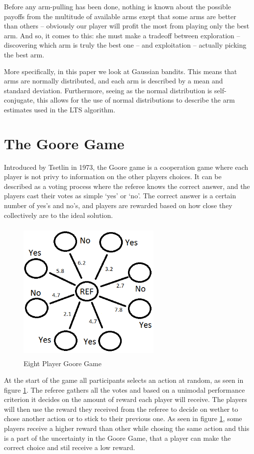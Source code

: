 Before any arm-pulling has been done, nothing is known about the possible 
payoffs from the multitude of available arms exept that some arms are better 
than others -- obviously our player will profit the most from playing only the 
best arm. And so, it comes to this: she must make a tradeoff between exploration 
-- discovering which arm is truly the best one -- and exploitation -- actually 
picking the best arm.

More specifically, in this paper we look at Gaussian bandits.
This means that arms are normally distributed, and each arm is described by a mean and standard deviation.
Furthermore, seeing as the normal distribution is self-conjugate, this allows for the
use of normal distributions to describe the arm estimates used in the LTS algorithm.

\section{The Goore Game}
Introduced by Tsetlin in 1973, the Goore game is a cooperation game where each  
player is not privy to information on the other players choices. It can be 
described as a voting process where the referee knows the correct answer, and 
the players cast their votes as simple ‘yes’ or ‘no’. The correct answer is a 
certain number of yes’s and no’s, and players are rewarded based on how close 
they collectively are to the ideal solution.

\begin{figure}[h]
\centering
\includegraphics[height=70mm,width=70mm]{images/goore_game}
\caption{Eight Player Goore Game}
\label{fig:gg}
\end{figure}
At the start of the game all participants selects an action at random, as seen in figure \ref{fig:gg}. The referee
gathers all the votes and based on a unimodal performance criterion it decides on
the amount of reward each player will receive. The players will then use the reward they received from the
referee to decide on wether to chose another action or to stick to their previous one. As seen in figure \ref{fig:gg},
some players receive a higher reward than other while chosing the same action and this is a part
of the uncertainty in the Goore Game, that a player can make the correct choice and stil receive a low
reward.

